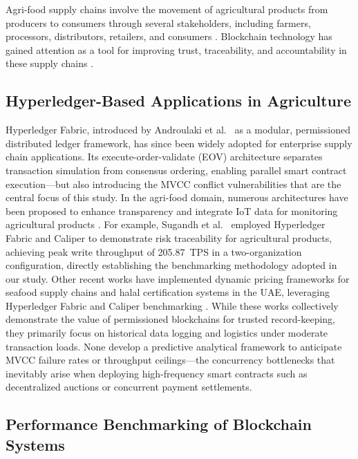 \documentclass[12pt]{article}
\begin{document}
Agri-food supply chains involve the movement of agricultural products from producers to consumers through several stakeholders, including farmers, processors, distributors, retailers, and consumers \citep{weerabahu_challenges_2022,nayal_antecedents_2021}. Blockchain technology has gained attention as a tool for improving trust, traceability, and accountability in these supply chains \citep{zhao_blockchain_2019,shahid_blockchain-based_2020}.

\subsection{Hyperledger-Based Applications in Agriculture}

Hyperledger Fabric, introduced by Androulaki et al.~\citep{androulaki_hyperledger_2018} as a modular, permissioned distributed ledger framework, has since been widely adopted for enterprise supply chain applications. Its execute-order-validate (EOV) architecture separates transaction simulation from consensus ordering, enabling parallel smart contract execution---but also introducing the MVCC conflict vulnerabilities that are the central focus of this study. In the agri-food domain, numerous architectures have been proposed to enhance transparency and integrate IoT data for monitoring agricultural products \citep{marchese_blockchain-based_2022,zhang_information_2022,iftekhar_blockchain-based_2021,joo_evidence_2021}. For example, Sugandh et al.~\citep{sugandh_approach_2023} employed Hyperledger Fabric and Caliper to demonstrate risk traceability for agricultural products, achieving peak write throughput of 205.87~TPS in a two-organization configuration, directly establishing the benchmarking methodology adopted in our study. Other recent works have implemented dynamic pricing frameworks for seafood supply chains and halal certification systems in the UAE, leveraging Hyperledger Fabric and Caliper benchmarking \citep{rani_stp_2025,talib_blockchain-enabled_2026,keo_secure_2025}. While these works collectively demonstrate the value of permissioned blockchains for trusted record-keeping, they primarily focus on historical data logging and logistics under moderate transaction loads. None develop a predictive analytical framework to anticipate MVCC failure rates or throughput ceilings---the concurrency bottlenecks that inevitably arise when deploying high-frequency smart contracts such as decentralized auctions or concurrent payment settlements.

\subsection{Performance Benchmarking of Blockchain Systems}
\end{document}
